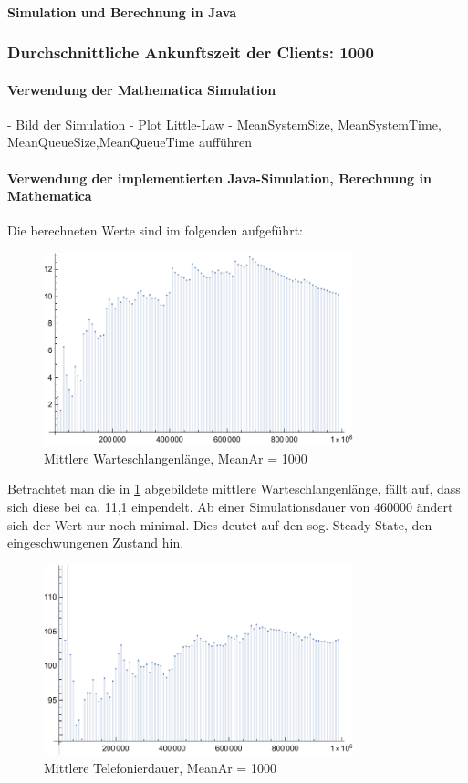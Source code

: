 \paragraph{Simulation und Berechnung in Java}


\subsubsection{Durchschnittliche Ankunftszeit der Clients: 1000}
\paragraph{Verwendung der Mathematica Simulation}
- Bild der Simulation 
- Plot Little-Law
- MeanSystemSize, MeanSystemTime, MeanQueueSize,MeanQueueTime aufführen
\paragraph{Verwendung der implementierten Java-Simulation, Berechnung in Mathematica}
Die berechneten Werte sind im folgenden aufgeführt:
\begin{figure}[htpb]
	\centering
	\includegraphics[width=0.8\textwidth]{abbildungen/auswertung1000/meanQueueTimePlot.pdf}
	\caption{Mittlere Warteschlangenlänge, MeanAr = 1000}
	\label{fig:meanQueueTime1000}
\end{figure}
Betrachtet man die in \ref{fig:meanQueueTime1000} abgebildete mittlere Warteschlangenlänge, fällt auf, dass sich diese bei ca. 11,1 einpendelt. Ab einer Simulationsdauer von $460 000$ ändert sich der Wert nur noch minimal. Dies deutet auf den sog. \glqq Steady State\grqq, den eingeschwungenen Zustand hin.

\begin{figure}[htpb]
	\centering
	\includegraphics[width=0.8\textwidth]{abbildungen/auswertung1000/meanCallingTimePlot.pdf}
	\caption{Mittlere Telefonierdauer, MeanAr = 1000}
	\label{fig:meanCallingTime1000}
\end{figure}

